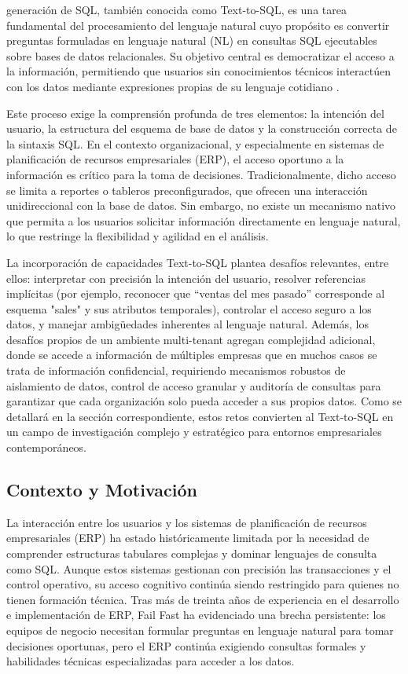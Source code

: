 \documentclass[journal]{IEEEtran}
\begin{document}
 generación de SQL, también conocida como Text-to-SQL, es una tarea fundamental del procesamiento del lenguaje natural cuyo propósito es convertir preguntas formuladas en lenguaje natural (NL) en consultas SQL ejecutables sobre bases de datos relacionales. Su objetivo central es democratizar el acceso a la información, permitiendo que usuarios sin conocimientos técnicos interactúen con los datos mediante expresiones propias de su lenguaje cotidiano \cite{liu2025survey, li2014nalir}.

Este proceso exige la comprensión profunda de tres elementos: la intención del usuario, la estructura del esquema de base de datos y la construcción correcta de la sintaxis SQL. En el contexto organizacional, y especialmente en sistemas de planificación de recursos empresariales (ERP), el acceso oportuno a la información es crítico para la toma de decisiones. Tradicionalmente, dicho acceso se limita a reportes o tableros preconfigurados, que ofrecen una interacción unidireccional con la base de datos. Sin embargo, no existe un mecanismo nativo que permita a los usuarios solicitar información directamente en lenguaje natural, lo que restringe la flexibilidad y agilidad en el análisis.

La incorporación de capacidades Text-to-SQL plantea desafíos relevantes, entre ellos: interpretar con precisión la intención del usuario, resolver referencias implícitas (por ejemplo, reconocer que ``ventas del mes pasado'' corresponde al esquema "sales" y sus atributos temporales), controlar el acceso seguro a los datos, y manejar ambigüedades inherentes al lenguaje natural. Además, los desafíos propios de un ambiente multi-tenant agregan complejidad adicional, donde se accede a información de múltiples empresas que en muchos casos se trata de información confidencial, requiriendo mecanismos robustos de aislamiento de datos, control de acceso granular y auditoría de consultas para garantizar que cada organización solo pueda acceder a sus propios datos. Como se detallará en la sección correspondiente, estos retos convierten al Text-to-SQL en un campo de investigación complejo y estratégico para entornos empresariales contemporáneos.

\subsection{Contexto y Motivación}

La interacción entre los usuarios y los sistemas de planificación de recursos empresariales (ERP) ha estado históricamente limitada por la necesidad de comprender estructuras tabulares complejas y dominar lenguajes de consulta como SQL. Aunque estos sistemas gestionan con precisión las transacciones y el control operativo, su acceso cognitivo continúa siendo restringido para quienes no tienen formación técnica. Tras más de treinta años de experiencia en el desarrollo e implementación de ERP, Fail Fast ha evidenciado una brecha persistente: los equipos de negocio necesitan formular preguntas en lenguaje natural para tomar decisiones oportunas, pero el ERP continúa exigiendo consultas formales y habilidades técnicas especializadas para acceder a los datos.
\end{document}
